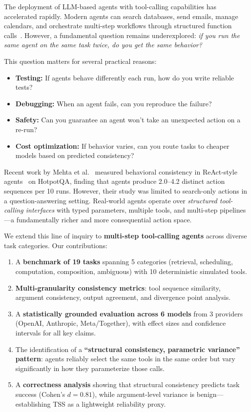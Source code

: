 \documentclass[letterpaper]{article}
\begin{document}
The deployment of LLM-based agents with tool-calling capabilities has accelerated rapidly. Modern agents can search databases, send emails, manage calendars, and orchestrate multi-step workflows through structured function calls~\cite{qin2023toolllm,li2023apibank,schick2023toolformer}. However, a fundamental question remains underexplored: \textit{if you run the same agent on the same task twice, do you get the same behavior?}

This question matters for several practical reasons:
\begin{itemize}[nosep]
    \item \textbf{Testing:} If agents behave differently each run, how do you write reliable tests?
    \item \textbf{Debugging:} When an agent fails, can you reproduce the failure?
    \item \textbf{Safety:} Can you guarantee an agent won't take an unexpected action on a re-run?
    \item \textbf{Cost optimization:} If behavior varies, can you route tasks to cheaper models based on predicted consistency?
\end{itemize}

Recent work by Mehta et al.~\cite{mehta2026disagree} measured behavioral consistency in ReAct-style agents~\cite{yao2023react} on HotpotQA, finding that agents produce 2.0--4.2 distinct action sequences per 10 runs. However, their study was limited to search-only actions in a question-answering setting. Real-world agents operate over \textit{structured tool-calling interfaces} with typed parameters, multiple tools, and multi-step pipelines---a fundamentally richer and more consequential action space.

We extend this line of inquiry to \textbf{multi-step tool-calling agents} across diverse task categories. Our contributions:

\begin{enumerate}[nosep]
    \item A \textbf{benchmark of 19 tasks} spanning 5 categories (retrieval, scheduling, computation, composition, ambiguous) with 10 deterministic simulated tools.
    \item \textbf{Multi-granularity consistency metrics}: tool sequence similarity, argument consistency, output agreement, and divergence point analysis.
    \item A \textbf{statistically grounded evaluation across 6 models} from 3 providers (OpenAI, Anthropic, Meta/Together), with effect sizes and confidence intervals for all key claims.
    \item The identification of a \textbf{``structural consistency, parametric variance'' pattern}: agents reliably select the same tools in the same order but vary significantly in how they parameterize those calls.
    \item A \textbf{correctness analysis} showing that structural consistency predicts task success (Cohen's $d = 0.81$), while argument-level variance is benign---establishing TSS as a lightweight reliability proxy.
\end{enumerate}
\end{document}
